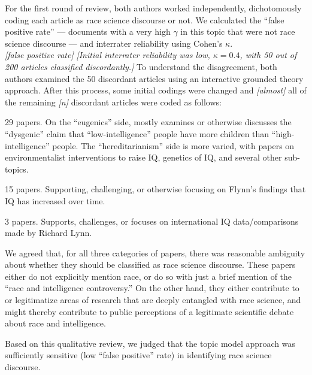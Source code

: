 \documentclass[12pt]{article}
\providecommand{\tightlist}{%
  \setlength{\itemsep}{0pt}\setlength{\parskip}{0pt}}
\begin{document}
For the first round of review, both authors worked independently,
dichotomously coding each article as race science discourse or not. We
calculated the ``false positive rate'' --- documents with a very high
\(\gamma\) in this topic that were not race science discourse --- and
interrater reliability using Cohen's \(\kappa\).\\
\emph{{[}false positive rate{]}} \emph{{[}Initial interrater reliability
was low, \(\kappa = 0.4\), with 50 out of 200 articles classified
discordantly.{]}} To understand the disagreement, both authors examined
the 50 discordant articles using an interactive grounded theory
approach. After this process, some initial codings were changed and
\emph{{[}almost{]}} all of the remaining \emph{{[}n{]}} discordant
articles were coded as follows:

\begin{description}
\tightlist
\item[hereditarianism and/or eugenics]
29 papers. On the ``eugenics'' side, mostly examines or otherwise
discusses the ``dysgenic'' claim that ``low-intelligence'' people have
more children than ``high-intelligence'' people. The ``hereditarianism''
side is more varied, with papers on environmentalist interventions to
raise IQ, genetics of IQ, and several other sub-topics.
\item[Flynn effect]
15 papers. Supporting, challenging, or otherwise focusing on Flynn's
findings that IQ has increased over time.
\item[Lynn/national IQ]
3 papers. Supports, challenges, or focuses on international IQ
data/comparisons made by Richard Lynn.
\end{description}

We agreed that, for all three categories of papers, there was reasonable
ambiguity about whether they should be classified as race science
discourse. These papers either do not explicitly mention race, or do so
with just a brief mention of the ``race and intelligence controversy.''
On the other hand, they either contribute to or legitimatize areas of
research that are deeply entangled with race science, and might thereby
contribute to public perceptions of a legitimate scientific debate about
race and intelligence.

Based on this qualitative review, we judged that the topic model
approach was sufficiently sensitive (low ``false positive'' rate) in
identifying race science discourse.
\end{document}
